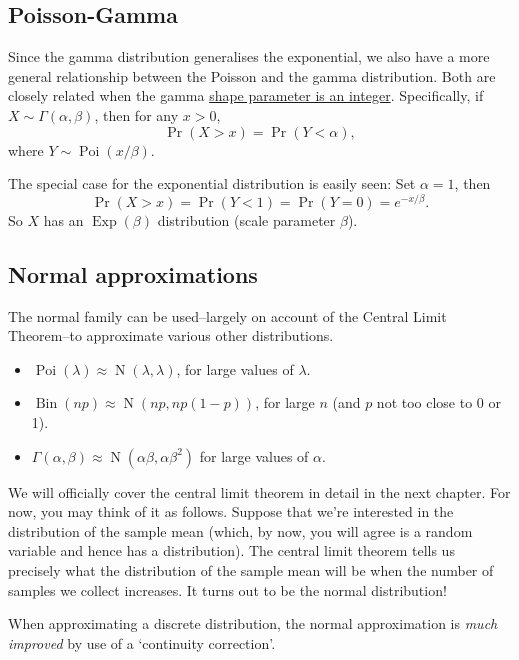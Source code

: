 \documentclass[
]{book}
\providecommand{\tightlist}{%
  \setlength{\itemsep}{0pt}\setlength{\parskip}{0pt}}
\DeclareMathOperator{\N}{N}
\DeclareMathOperator{\Bin}{Bin}
\DeclareMathOperator{\Pois}{Poi}
\DeclareMathOperator{\Exp}{Exp}
\theoremstyle{definition}
\theoremstyle{definition}
\theoremstyle{definition}
\theoremstyle{definition}
\theoremstyle{remark}
\begin{document}
\hypertarget{poisson-gamma}{%
\subsection{Poisson-Gamma}\label{poisson-gamma}}

Since the gamma distribution generalises the exponential, we also have a more general relationship between the Poisson and the gamma distribution.
Both are closely related when the gamma \uline{shape parameter is an integer}.
Specifically, if \(X\sim\Gamma(\alpha,\beta)\), then for any \(x>0\),
\[
\Pr(X>x) = \Pr(Y<\alpha),
\]
where \(Y\sim\Pois(x/\beta)\).

The special case for the exponential distribution is easily seen: Set \(\alpha=1\), then
\[
\Pr(X>x) = \Pr(Y<1) = \Pr(Y=0) = e^{-x/\beta}.
\]
So \(X\) has an \(\Exp(\beta)\) distribution (scale parameter \(\beta\)).

\hypertarget{normal-approximations}{%
\subsection{Normal approximations}\label{normal-approximations}}

The normal family can be used--largely on account of the Central Limit Theorem--to approximate various other distributions.

\begin{itemize}
\tightlist
\item
  \(\Pois(\lambda) \approx \N(\lambda,\lambda)\), for large values of \(\lambda\).
\item
  \(\Bin(np) \approx \N(np,np(1-p))\), for large \(n\) (and \(p\) not too close to 0 or 1).
\item
  \(\Gamma(\alpha,\beta) \approx \N(\alpha\beta, \alpha\beta^2)\) for large values of \(\alpha\).
\end{itemize}

We will officially cover the central limit theorem in detail in the next chapter. For now, you may think of it as follows. Suppose that we're interested in the distribution of the sample mean (which, by now, you will agree is a random variable and hence has a distribution). The central limit theorem tells us precisely what the distribution of the sample mean will be when the number of samples we collect increases. It turns out to be the normal distribution!

When approximating a discrete distribution, the normal approximation is \emph{much improved} by use of a `continuity correction'.
\end{document}
